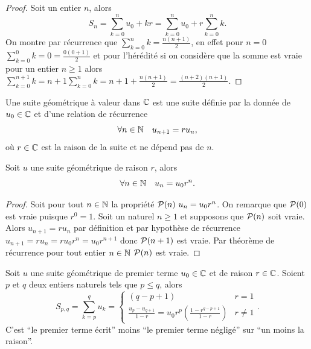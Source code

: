 \begin{proof}
  Soit un entier \(n\), alors
  \begin{equation}
    S_n = \sum_{k = 0}^n u_0 + kr= \sum_{k = 0}^n u_0 + r\sum_{k = 0}^n k.
  \end{equation}
  On montre par récurrence que \(\sum_{k = 0}^n k = \frac{n(n + 1)}{2}\), en
  effet pour \(n = 0\) \(\sum_{k = 0}^0 k = 0 = \frac{0(0 + 1)}{2}\) et pour
  l'hérédité si on considère que la somme est vraie pour un entier \(n \geqslant
  1\) alors \(\sum_{k = 0}^{n + 1} k= n + 1 \sum_{k = 0}^n k = n + 1 + \frac{n(n
  + 1)}{2} = \frac{(n + 2)(n + 1)}{2}\).
\end{proof}

\begin{defdef}
  Une suite géométrique à valeur dans \(\C\) est une suite définie par la donnée
  de \(u_0\in\C\) et d'une relation de récurrence
  \begin{equation}
    \forall n \in \N \quad u_{n + 1} = ru_n,
  \end{equation}
  où \(r\in\C\) est la raison de la suite et ne dépend pas de \(n\).
\end{defdef}

\begin{prop}
  Soit \(u\) une suite géométrique de raison \(r\), alors
  \begin{equation}
    \forall n \in \N \quad u_n = u_0r^n.
  \end{equation}
\end{prop}

\begin{proof}
  Soit pour tout \(n\in\N\) la propriété \(\P(n)\ u_n = u_0r^n\). On remarque
  que \(\P(0)\) est vraie puisque \(r^0 = 1\). Soit un naturel \(n\geqslant 1\)
  et supposons que \(\P(n)\) soit vraie. Alors \(u_{n + 1} = r u_n\) par
  définition et par hypothèse de récurrence \(u_{n + 1} = r u_n = r u_0 r^n =
  u_0 r^{n + 1}\) donc \(\P(n + 1)\) est vraie. Par théorème de récurrence pour
  tout entier \(n\in\N\) \(\P(n)\) est vraie.
\end{proof}

\begin{prop}
  Soit \(u\) une suite géométrique de premier terme \(u_0\in\C\) et de raison
  \(r\in\C\). Soient \(p\) et \(q\) deux entiers naturels tels que \(p\leqslant
  q\), alors
  \begin{equation}
    S_{p, q} = \sum_{k = p}^q u_k=
    \begin{cases}
      (q - p + 1) & r = 1 \\
      \frac{u_p - u_{q + 1}}{1 - r} = u_0r^p\left(\frac{1 - r^{q - p + 1}}{1 -
  r}\right) & r \neq 1
\end{cases}.
\end{equation}
C'est ``le premier terme écrit'' moins ``le premier terme négligé'' sur ``un
moins la raison''.
\end{prop}


